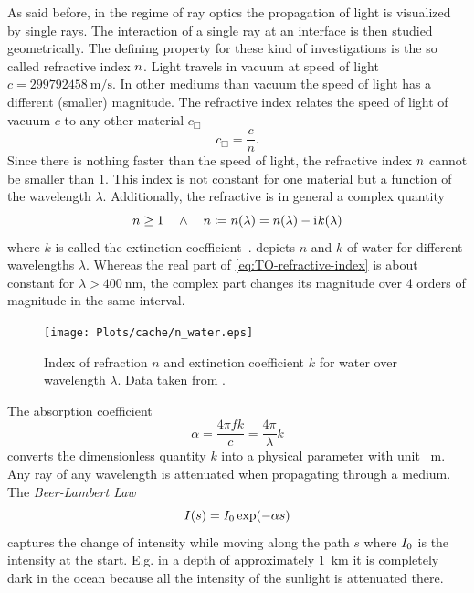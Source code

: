 As said before, in the regime of ray optics the propagation of light is 
visualized by single rays. The interaction of a single ray at an interface is 
then studied geometrically. The defining property for these kind of 
investigations is the so called refractive index $n$. Light travels 
in vacuum at speed of light $c=\SI{299792458}{\m\per\s}$. In other mediums than 
vacuum the speed of light has a different (smaller) magnitude. The refractive 
index relates the speed of light of vacuum $c$ to any other material $c_{\Box}$
\begin{equation}
  c_{\Box} = \frac{c}{n}.
  \label{eq:TO-lightspeed}
\end{equation}
Since there is nothing faster than the speed of light, the refractive index 
$n$ cannot be smaller than 1. This index is not constant for one 
material but a function of the wavelength $\lambda$. Additionally, the 
refractive is in general a complex quantity
\begin{equation}
  n\geq 1 \quad \wedge \quad n \coloneqq 
  n(\lambda) = n(\lambda) - \mathrm{i}\mkern1mu k(\lambda)
  \label{eq:TO-refractive-index}
\end{equation}
where $k$ is called the extinction coefficient~\cite{Jackson2013}. 
 depicts $n$ and $k$ of water for different wavelengths 
$\lambda$. Whereas the real part of \cref{eq:TO-refractive-index} is about 
constant for $\lambda > \SI{400}{\nm}$, the complex part changes its magnitude 
over 4 orders of magnitude in the same interval.

\begin{figure}[tbp]
  \centering
  \texttt{[image: Plots/cache/n\_water.eps]}
  \caption{Index of refraction $n$ and extinction coefficient $k$ for water 
  over wavelength $\lambda$. Data taken from \cite{Hale1973,Segelstein1981}.}
  \label{fig:TO-n_water}
\end{figure}


The absorption coefficient~\cite{Hecht2017}
\begin{equation}
  \alpha = \frac{4\pi f k}{c} = \frac{4\pi}{\lambda}k
  \label{eq:TO-alpha}
\end{equation}
converts the dimensionless quantity $k$ into a physical parameter with unit 
\si{\per\meter}. Any ray of any wavelength is attenuated when propagating 
through a medium. The \emph{Beer-Lambert Law}
\begin{equation}
  I(s) = I_{0}\exp(-\alpha s)
  \label{eq:TO-beer-lambert}
\end{equation}
captures the change of intensity while moving along the path $s$ where 
$I_{0}$ is the intensity at the start. E.g. in a depth of 
approximately \SI{1}{\kilo\meter} it is completely dark in the ocean because 
all the intensity of the sunlight is attenuated there.

